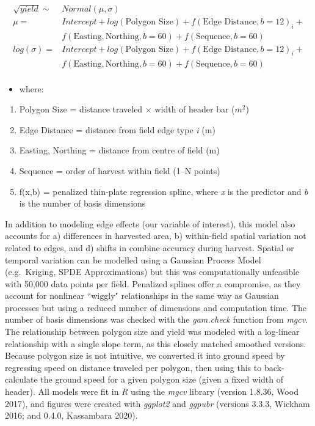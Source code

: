 \documentclass[]{elsarticle} %
\providecommand{\tightlist}{%
  \setlength{\itemsep}{0pt}\setlength{\parskip}{0pt}}
\begin{document}
\begin{equation}
  \begin{split}
  \sqrt{yield} \sim & Normal (\mu, \sigma)\\
  \mu = & Intercept + log(\text{Polygon Size}) + f(\text{Edge Distance}, b=12)_i + \\
   & f(\text{Easting}, \text{Northing}, b=60) + f(\text{Sequence}, b=60) \\
  log(\sigma) =  & Intercept + log(\text{Polygon Size}) + f(\text{Edge Distance}, b=12)_i + \\
   & f(\text{Easting}, \text{Northing}, b=60) + f(\text{Sequence}, b=60) \\
  \end{split}
  \end{equation}

\begin{itemize}
\tightlist
\item
  where:
\end{itemize}

\begin{enumerate}
\def\labelenumi{\arabic{enumi}.}
\tightlist
\item
  Polygon Size = distance traveled \(\times\) width of header bar (\(m^2\))
\item
  Edge Distance = distance from field edge type \emph{i} (m)
\item
  Easting, Northing = distance from centre of field (m)
\item
  Sequence = order of harvest within field (1--N points)
\item
  f(x,b) = penalized thin-plate regression spline, where \emph{x} is the predictor and \emph{b} is the number of basis dimensions
\end{enumerate}

In addition to modeling edge effects (our variable of interest), this model also accounts for a) differences in harvested area, b) within-field spatial variation not related to edges, and d) shifts in combine accuracy during harvest.
Spatial or temporal variation can be modelled using a Gaussian Process Model (e.g.~Kriging, SPDE Approximations) but this was computationally unfeasible with 50,000 data points per field.
Penalized splines offer a compromise, as they account for nonlinear ``wiggly" relationships in the same way as Gaussian processes but using a reduced number of dimensions and computation time.
The number of basis dimensions was checked with the \emph{gam.check} function from \emph{mgcv}.
The relationship between polygon size and yield was modeled with a log-linear relationship with a single slope term, as this closely matched smoothed versions.
Because polygon size is not intuitive, we converted it into ground speed by regressing speed on distance traveled per polygon, then using this to back-calculate the ground speed for a given polygon size (given a fixed width of header).
All models were fit in \emph{R} using the \emph{mgcv} library (version 1.8.36, Wood 2017), and figures were created with \emph{ggplot2} and \emph{ggpubr} (versions 3.3.3, Wickham 2016; and 0.4.0, Kassambara 2020).
\end{document}
